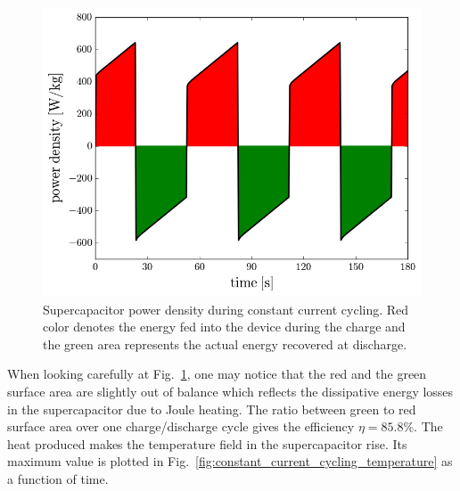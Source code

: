 \documentclass[10pt, oneside]{article}   	%
\begin{document}
\begin{figure}[h!]
    \centering
    \includegraphics[width=\textwidth]{figures/constant_current_cycling_power_density}
    \caption{Supercapacitor power density during constant current cycling.
Red color denotes the energy fed into the device during the charge and the
green area represents the actual energy recovered at discharge.
    }
    \label{fig:constant_current_cycling_power_density}
\end{figure}
When looking carefully at
Fig.~\ref{fig:constant_current_cycling_power_density}, one may notice that
the red and the green surface area are slightly out of balance which reflects
the dissipative energy losses in the supercapacitor due to Joule heating.
The ratio between green to red surface area over one charge/discharge cycle
gives the efficiency $\eta = 85.8\%$.  The heat produced makes the temperature
field in the supercapacitor rise.  Its maximum value is plotted in
Fig.~\ref{fig:constant_current_cycling_temperature} as a function of time.
\end{document}
